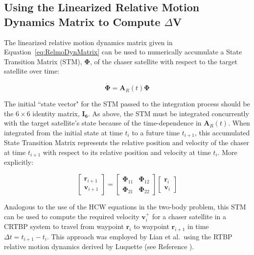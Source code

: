 \documentclass[letterpaper, preprint, paper,11pt]{AAS}	%
\begin{document}
\subsection{Using the Linearized Relative Motion Dynamics Matrix to Compute \(\Delta\)V}

The linearized relative motion dynamics matrix given in Equation~\eqref{eq:RelmoDynMatrix} can be used to numerically accumulate a State Transition Matrix (STM), \(\boldsymbol{\Phi}\), of the chaser satellite with respect to the target satellite over time:

\begin{equation} \label{eq:STM}
	\dot{\boldsymbol{\Phi}} = \mathbf{A}_R(t)\boldsymbol{\Phi}
\end{equation}

The initial ``state vector" for the STM passed to the integration process should be the \(6\times6\) identity matrix, \(\mathbf{I_6}\).  As above, the STM must be integrated concurrently with the target satellite's state because of the time-dependence in \(\mathbf{A}_R(t)\).  When integrated from the initial state at time \(t_i\) to a future time \(t_{i+1}\), this accumulated State Transition Matrix represents the relative position and velocity of the chaser at time \(t_{i+1}\) with respect to its relative position and velocity at time \(t_i\).  More explicitly:


\begin{equation}
	\begin{bmatrix}
		\mathbf{r}_{i+1} \\
		\mathbf{v}_{i+1}
	\end{bmatrix}
	= 
	\begin{bmatrix}
		\boldsymbol{\Phi}_{11} & \boldsymbol{\Phi}_{12} \\
		\boldsymbol{\Phi}_{21} & \boldsymbol{\Phi}_{22}
	\end{bmatrix}
	\begin{bmatrix}
		\mathbf{r}_i \\
		\mathbf{v}_i
	\end{bmatrix}
\end{equation}

Analogous to the use of the HCW equations in the two-body problem, this STM can be used to compute the required velocity \(\mathbf{v}_i^+\) for a chaser satellite in a CRTBP system to travel from waypoint \(\mathbf{r}_i\) to waypoint \(\mathbf{r}_{i+1}\) in time \( \Delta t = t_{i+1} - t_i\).  This approach was employed by Lian et al.~using the RTBP relative motion dynamics derived by Luquette (see Reference ). 
\end{document}

